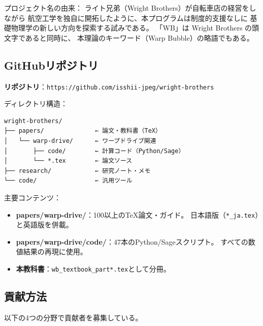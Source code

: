 \documentclass[11pt,a4paper]{article}
\begin{document}
\noindent
プロジェクト名の由来：
ライト兄弟（Wright Brothers）が自転車店の経営をしながら
航空工学を独自に開拓したように、本プログラムは制度的支援なしに
基礎物理学の新しい方向を探索する試みである。
「WB」は Wright Brothers の頭文字であると同時に、
本理論のキーワード（Warp Bubble）の略語でもある。


\subsection{GitHubリポジトリ}
\label{sec:16.2}

\begin{tcolorbox}[colback=gray!5!white, colframe=gray!60!black]
\textbf{リポジトリ}：\texttt{https://github.com/isshii-jpeg/wright-brothers}
\end{tcolorbox}

\noindent
ディレクトリ構造：

\begin{verbatim}
wright-brothers/
├── papers/              ← 論文・教科書（TeX）
│   └── warp-drive/      ← ワープドライブ関連
│       ├── code/        ← 計算コード（Python/Sage）
│       └── *.tex        ← 論文ソース
├── research/            ← 研究ノート・メモ
└── code/                ← 汎用ツール
\end{verbatim}

\noindent
主要コンテンツ：
\begin{itemize}
\item \textbf{papers/warp-drive/}：100以上のTeX論文・ガイド。
日本語版（\texttt{*\_ja.tex}）と英語版を併載。
\item \textbf{papers/warp-drive/code/}：47本のPython/Sageスクリプト。
すべての数値結果の再現に使用。
\item \textbf{本教科書}：\texttt{wb\_textbook\_part*.tex}として分冊。
\end{itemize}


\subsection{貢献方法}
\label{sec:16.3}

以下の4つの分野で貢献者を募集している。
\end{document}
